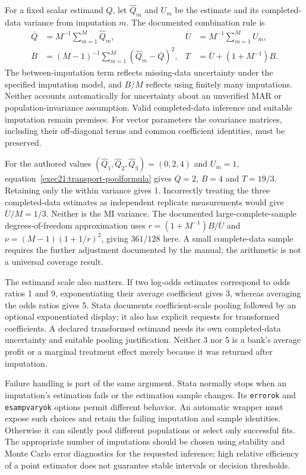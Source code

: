 For a fixed scalar estimand $Q$, let $\widehat Q_m$ and $U_m$ be the estimate
and its completed-data variance from imputation $m$. The documented combination
rule is
\begin{align}
 \overline Q&=M^{-1}\sum_{m=1}^M\widehat Q_m,&
 \overline U&=M^{-1}\sum_{m=1}^M U_m,\nonumber\\
 B&=(M-1)^{-1}\sum_{m=1}^M(\widehat Q_m-\overline Q)^2,&
 T&=\overline U+(1+M^{-1})B.
 \label{exec21:transport-poolformula}
\end{align}
The between-imputation term reflects missing-data uncertainty under the
specified imputation model, and $B/M$ reflects using finitely many imputations.
Neither accounts automatically for uncertainty about an unverified MAR or
population-invariance assumption. Valid completed-data inference and suitable
imputation remain premises. For vector parameters the covariance matrices,
including their off-diagonal terms and common coefficient identities, must be
preserved. \cite{exec21_transport_stata_estimate,exec21_transport_stata_substantive}

For the authored values $(\widehat Q_1,\widehat Q_2,\widehat Q_3)=(0,2,4)$
and $U_m=1$, equation~\eqref{exec21:transport-poolformula} gives
$\overline Q=2$, $B=4$ and $T=19/3$. Retaining only the within variance gives
1. Incorrectly treating the three completed-data estimates as independent
replicate measurements would give $\overline U/M=1/3$. Neither is the MI
variance. The documented large-complete-sample degrees-of-freedom approximation
uses $r=(1+M^{-1})B/\overline U$ and
$\nu=(M-1)(1+1/r)^2$, giving $361/128$ here. A small complete-data sample
requires the further adjustment documented by the manual; the arithmetic is
not a universal coverage result. \cite{exec21_transport_stata_estimate,exec21_transport_reference}

The estimand scale also matters. If two log-odds estimates correspond to odds
ratios 1 and 9, exponentiating their average coefficient gives 3, whereas
averaging the odds ratios gives 5. Stata documents coefficient-scale pooling
followed by an optional exponentiated display; it also has explicit requests
for transformed coefficients. A declared transformed estimand needs its own
completed-data uncertainty and suitable pooling justification. Neither 3 nor
5 is a bank's average profit or a marginal treatment effect merely because it
was returned after imputation. \cite{exec21_transport_stata_estimate,exec21_transport_reference}

Failure handling is part of the same argument. Stata normally stops when an
imputation's estimation fails or the estimation sample changes. Its
\texttt{errorok} and \texttt{esampvaryok} options permit different behavior.
An automatic wrapper must expose such choices and retain the failing
imputation and sample identities. Otherwise it can silently pool different
populations or select only successful fits. The appropriate number of
imputations should be chosen using stability and Monte Carlo error diagnostics
for the requested inference; high relative efficiency of a point estimator
does not guarantee stable intervals or decision thresholds.
\cite{exec21_transport_stata_estimate,exec21_transport_sas_mi_intro}

